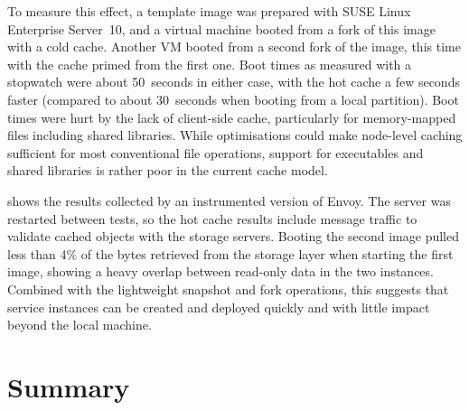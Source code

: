 To measure this effect, a template image was prepared with SUSE Linux Enterprise Server~10, and a virtual machine booted from a fork of this image with a cold cache. Another VM booted from a second fork of the image, this time with the cache primed from the first one. Boot times as measured with a stopwatch were about 50~seconds in either case, with the hot cache a few seconds faster (compared to about 30~seconds when booting from a local partition). Boot times were hurt by the lack of client-side cache, particularly for memory-mapped files including shared libraries. While optimisations could make node-level caching sufficient for most conventional file operations, support for executables and shared libraries is rather poor in the current cache model.

 shows the results collected by an instrumented version of Envoy. The server was restarted between tests, so the hot cache results include message traffic to validate cached objects with the storage servers. Booting the second image pulled less than 4\% of the bytes retrieved from the storage layer when starting the first image, showing a heavy overlap between read-only data in the two instances. Combined with the lightweight snapshot and fork operations, this suggests that service instances can be created and deployed quickly and with little impact beyond the local machine.

\section{Summary}
